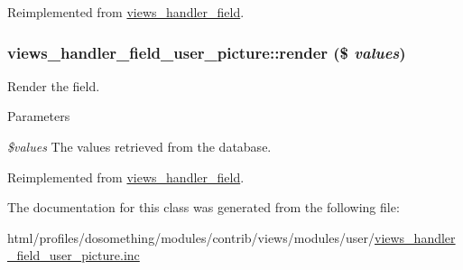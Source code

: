 Reimplemented from \hyperlink{classviews__handler__field_a0435d161922b7b4b84f02a2e79bb947a}{views\_\-handler\_\-field}.\hypertarget{classviews__handler__field__user__picture_a707edb06f305fa88542f20cbfec36a04}{
\subsubsection[{render}]{\setlength{\rightskip}{0pt plus 5cm}views\_\-handler\_\-field\_\-user\_\-picture::render (\$ {\em values})}}
\label{classviews__handler__field__user__picture_a707edb06f305fa88542f20cbfec36a04}
Render the field.


\begin{DoxyParams}{Parameters}
\item[{\em \$values}]The values retrieved from the database. \end{DoxyParams}


Reimplemented from \hyperlink{classviews__handler__field_a82ff951c5e9ceb97b2eab86f880cbc1e}{views\_\-handler\_\-field}.

The documentation for this class was generated from the following file:\begin{DoxyCompactItemize}
\item 
html/profiles/dosomething/modules/contrib/views/modules/user/\hyperlink{views__handler__field__user__picture_8inc}{views\_\-handler\_\-field\_\-user\_\-picture.inc}\end{DoxyCompactItemize}
